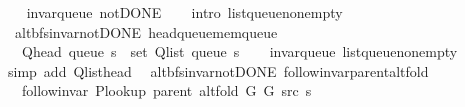 \begin{isabellebody}
%
\endisadeliminvisible
%
\isadelimproof
\ \ %
\endisadelimproof
%
\isatagproof
{}\isamarkupfalse%
\ invar{\isacharunderscore}{\kern0pt}queue\ not{\isacharunderscore}{\kern0pt}DONE\isanewline
\ \ \isamarkupfalse%
\ {\isacharparenleft}{\kern0pt}intro\ list{\isacharunderscore}{\kern0pt}queue{\isacharunderscore}{\kern0pt}non{\isacharunderscore}{\kern0pt}empty{\isacharparenright}{\kern0pt}%
\endisatagproof
{\isafoldproof}%
%
\isadelimproof
\isanewline
%
\endisadelimproof
%
\isadeliminvisible
\isanewline
%
\endisadeliminvisible
%
\isataginvisible
{}\isamarkupfalse%
\ {\isacharparenleft}{\kern0pt}\ alt{\isacharunderscore}{\kern0pt}bfs{\isacharunderscore}{\kern0pt}invar{\isacharunderscore}{\kern0pt}not{\isacharunderscore}{\kern0pt}DONE{\isacharparenright}{\kern0pt}\ head{\isacharunderscore}{\kern0pt}queue{\isacharunderscore}{\kern0pt}mem{\isacharunderscore}{\kern0pt}queue{\isacharcolon}{\kern0pt}\isanewline
\ \ \ {\isachardoublequoteopen}Q{\isacharunderscore}{\kern0pt}head\ {\isacharparenleft}{\kern0pt}queue\ s{\isacharparenright}{\kern0pt}\ {\isasymin}\ set\ {\isacharparenleft}{\kern0pt}Q{\isacharunderscore}{\kern0pt}list\ {\isacharparenleft}{\kern0pt}queue\ s{\isacharparenright}{\kern0pt}{\isacharparenright}{\kern0pt}{\isachardoublequoteclose}%
\endisataginvisible
{\isafoldinvisible}%
%
\isadeliminvisible
\isanewline
%
\endisadeliminvisible
%
\isadelimproof
\ \ %
\endisadelimproof
%
\isatagproof
{}\isamarkupfalse%
\ invar{\isacharunderscore}{\kern0pt}queue\ list{\isacharunderscore}{\kern0pt}queue{\isacharunderscore}{\kern0pt}non{\isacharunderscore}{\kern0pt}empty\isanewline
\ \ \isamarkupfalse%
\ {\isacharparenleft}{\kern0pt}simp\ add{\isacharcolon}{\kern0pt}\ Q{\isachardot}{\kern0pt}list{\isacharunderscore}{\kern0pt}head{\isacharparenright}{\kern0pt}%
\endisatagproof
{\isafoldproof}%
%
\isadelimproof
\isanewline
%
\endisadelimproof
\isanewline
{}\isamarkupfalse%
\ {\isacharparenleft}{\kern0pt}\ alt{\isacharunderscore}{\kern0pt}bfs{\isacharunderscore}{\kern0pt}invar{\isacharunderscore}{\kern0pt}not{\isacharunderscore}{\kern0pt}DONE{\isacharparenright}{\kern0pt}\ follow{\isacharunderscore}{\kern0pt}invar{\isacharunderscore}{\kern0pt}parent{\isacharunderscore}{\kern0pt}alt{\isacharunderscore}{\kern0pt}fold{\isacharcolon}{\kern0pt}\isanewline
\ \ \ {\isachardoublequoteopen}follow{\isacharunderscore}{\kern0pt}invar\ {\isacharparenleft}{\kern0pt}P{\isacharunderscore}{\kern0pt}lookup\ {\isacharparenleft}{\kern0pt}parent\ {\isacharparenleft}{\kern0pt}alt{\isacharunderscore}{\kern0pt}fold\ G{}\ G{}\ src\ s{\isacharparenright}{\kern0pt}{\isacharparenright}{\kern0pt}{\isacharparenright}{\kern0pt}{\isachardoublequoteclose}\isanewline

\end{isabellebody}
